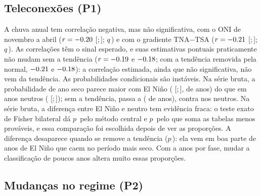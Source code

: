 \documentclass[11pt,a4paper]{article}
\newcommand{\IC}[2]{[#1;\,#2]}            %
\begin{document}
\subsection{Teleconexões (P1)}
A chuva anual tem correlação negativa, mas não significativa, com o ONI de novembro a abril
($r = \num{-0.20}$ \IC{\ROniBrutaICinf}{\ROniBrutaICsup}; $q$\,\QOniBruta) e com o gradiente
TNA$-$TSA ($r = \num{-0.21}$ \IC{\RGradBrutaICinf}{\RGradBrutaICsup}; $q$\,\QGradBruta). As
correlações têm o sinal esperado, e suas estimativas pontuais praticamente não mudam sem a tendência
($r = \num{-0.19}$ e $\num{-0.18}$; com a tendência removida pela normal, $\num{-0.21}$ e
$\num{-0.18}$): a correlação estimada, ainda que não significativa, não vem da tendência. As probabilidades condicionais são
instáveis. Na série bruta, a probabilidade de ano seco parece maior com El Niño (\PSecoNino{}
\IC{\PSecoNinoICinf}{\PSecoNinoICsup}, \NSecosNino{} de \NFaseNino{} anos) do que em anos neutros
(\PSecoNeutro{} \IC{\PSecoNeutroICinf}{\PSecoNeutroICsup}); sem a tendência, passa a
\PSecoNinoDet{} (\NSecosNinoDet{} de \NFaseNinoDet{} anos), contra \PSecoNeutroDet{} nos neutros.
Na série bruta, a diferença entre El Niño e neutro tem evidência fraca: o teste exato de Fisher
bilateral dá $p$\,\PFisherNinoNeutro{} pelo método central e $p$\,\PFisherNinoNeutroMinlike{} pelo que
soma as tabelas menos prováveis, e essa comparação foi escolhida depois de ver as proporções. A
diferença desaparece quando se remove a tendência ($p$\,\PFisherNinoNeutroDet):
ela vem em boa parte de anos de El Niño que caem no período mais seco. Com \NFaseNino{} a
\NFaseNeutro{} anos por fase, mudar a classificação de poucos anos altera muito essas proporções.

\subsection{Mudanças no regime (P2)}
\end{document}
